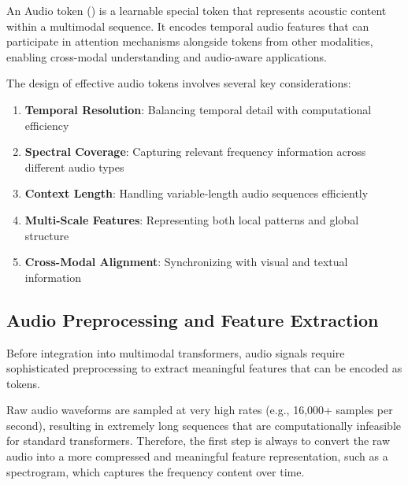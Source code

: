 \begin{definition}
An Audio token () is a learnable special token that represents acoustic content within a multimodal sequence. It encodes temporal audio features that can participate in attention mechanisms alongside tokens from other modalities, enabling cross-modal understanding and audio-aware applications.
\end{definition}

The design of effective audio tokens involves several key considerations:

\begin{enumerate}
\item \textbf{Temporal Resolution}: Balancing temporal detail with computational efficiency
\item \textbf{Spectral Coverage}: Capturing relevant frequency information across different audio types
\item \textbf{Context Length}: Handling variable-length audio sequences efficiently
\item \textbf{Multi-Scale Features}: Representing both local patterns and global structure
\item \textbf{Cross-Modal Alignment}: Synchronizing with visual and textual information
\end{enumerate}

\subsection{Audio Preprocessing and Feature Extraction}

Before integration into multimodal transformers, audio signals require sophisticated preprocessing to extract meaningful features that can be encoded as tokens.

Raw audio waveforms are sampled at very high rates (e.g., 16,000+ samples per second), resulting in extremely long sequences that are computationally infeasible for standard transformers. Therefore, the first step is always to convert the raw audio into a more compressed and meaningful feature representation, such as a spectrogram, which captures the frequency content over time.

